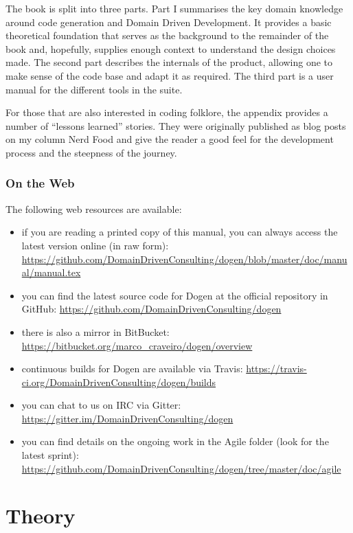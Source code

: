 \documentclass{book}
\begin{document}
The book is split into three parts. Part I summarises the key domain
knowledge around code generation and Domain Driven Development. It
provides a basic theoretical foundation that serves as the background
to the remainder of the book and, hopefully, supplies enough context
to understand the design choices made. The second part describes the
internals of the product, allowing one to make sense of the code base
and adapt it as required. The third part is a user manual for the
different tools in the suite.

For those that are also interested in coding folklore, the appendix
provides a number of ``lessons learned'' stories. They were originally
published as blog posts on my column Nerd Food and give the reader a
good feel for the development process and the steepness of the
journey.

\section*{On the Web}

The following web resources are available:

\begin{itemize}
\item if you are reading a printed copy of this manual, you can always
  access the latest version online (in raw \LaTeXe form): \url{https://github.com/DomainDrivenConsulting/dogen/blob/master/doc/manual/manual.tex}
\item you can find the latest source code for Dogen at the official
  repository in GitHub:
  \url{https://github.com/DomainDrivenConsulting/dogen}
\item there is also a mirror in BitBucket:
  \url{https://bitbucket.org/marco_craveiro/dogen/overview}
\item continuous builds for Dogen are available via Travis:
  \url{https://travis-ci.org/DomainDrivenConsulting/dogen/builds}
\item you can chat to us on IRC via Gitter:
  \url{https://gitter.im/DomainDrivenConsulting/dogen}
\item you can find details on the ongoing work in the Agile folder
  (look for the latest sprint):
  \url{https://github.com/DomainDrivenConsulting/dogen/tree/master/doc/agile}
\end{itemize}

\part{Theory}
\end{document}
